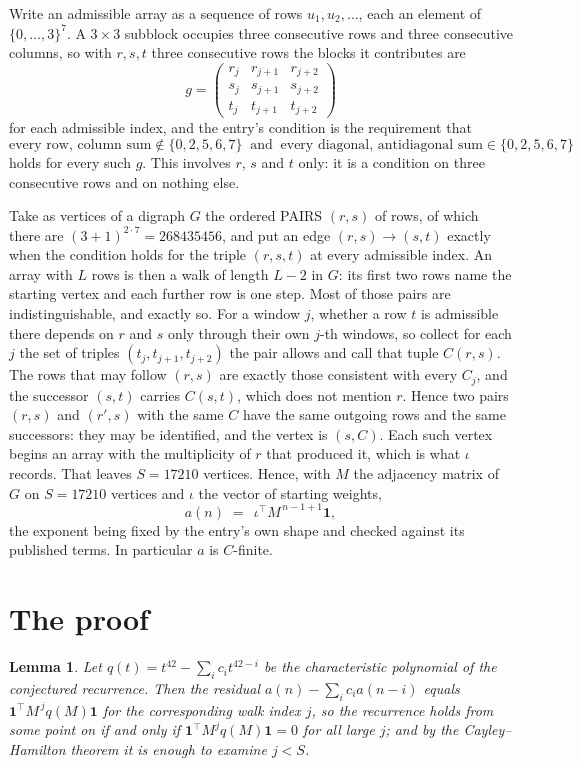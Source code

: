 \documentclass[11pt,a4paper]{article}
\theoremstyle{plain}
\newtheorem{lemma}[theorem]{Lemma}
\theoremstyle{definition}
\begin{document}
Write an admissible array as a sequence of rows $u_1,u_2,\dots$, each an element of
$\{0,\dots,3\}^{7}$. A $3\times3$ subblock occupies three consecutive rows and
three consecutive columns, so with $r,s,t$ three consecutive rows the blocks it
contributes are
\[
g=\begin{pmatrix}r_j&r_{j+1}&r_{j+2}\\ s_j&s_{j+1}&s_{j+2}\\ t_j&t_{j+1}&t_{j+2}\end{pmatrix}
\]
for each admissible index, and the entry's condition is the requirement that
\[
\text{every row, column sum} \notin \{0,2,5,6,7\}\ \text{ and }\ \text{every diagonal, antidiagonal sum} \in \{0,2,5,6,7\}
\]
holds for every such $g$. This involves $r$, $s$ and $t$ only: it is a condition on
three consecutive rows and on nothing else.

Take as vertices of a digraph $G$ the ordered PAIRS $(r,s)$ of rows, of which there are
$(3+1)^{2\cdot7}=268435456$, and put an edge $(r,s)\to(s,t)$ exactly when the condition
holds for the triple $(r,s,t)$ at every admissible index. An array with $L$ rows is then a
walk of length $L-2$ in $G$: its first two rows name the starting vertex and each further
row is one step. Most of those pairs are indistinguishable, and exactly so. For a window $j$, whether a row $t$ is admissible there depends on $r$ and $s$ only through their own $j$-th windows, so collect for each $j$ the set of triples $(t_j,t_{j+1},t_{j+2})$ the pair allows and call that tuple $C(r,s)$. The rows that may follow $(r,s)$ are exactly those consistent with every $C_j$, and the successor $(s,t)$ carries $C(s,t)$, which does not mention $r$. Hence two pairs $(r,s)$ and $(r',s)$ with the same $C$ have the same outgoing rows and the same successors: they may be identified, and the vertex is $(s,C)$. Each such vertex begins an array with the multiplicity of $r$ that produced it, which is what $\iota$ records. That leaves $S=17210$ vertices. Hence, with $M$ the adjacency matrix of $G$ on $S=17210$ vertices and
$\iota$ the vector of starting weights,
\[
a(n)\;=\;\,\iota^{\!\top}M^{\,n-1+1}\mathbf{1},
\]
the exponent being fixed by the entry's own shape and checked against its published terms.
In particular $a$ is $C$-finite.

\section{The proof}

\begin{lemma}\label{lem:crit}
Let $q(t)=t^{42}-\sum_i c_it^{42-i}$ be the characteristic polynomial of the
conjectured recurrence. Then the residual $a(n)-\sum_ic_ia(n-i)$ equals
$\mathbf{1}^{\!\top}M^{\,j}q(M)\mathbf{1}$ for the corresponding walk index
$j$, so the recurrence holds from some point on if and only if
$\mathbf{1}^{\!\top}M^{j}q(M)\mathbf{1}=0$ for all large $j$; and by the
Cayley--Hamilton theorem it is enough to examine $j<S$.
\end{lemma}
\end{document}
